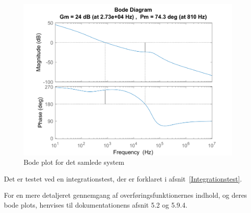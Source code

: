 \begin{figure}[H]
	\center
	\includegraphics[max width=0.7\linewidth]{../dokumentation/tex/2iteration/billeder/MATLAB_total.PNG}
	\caption{Bode plot for det samlede system}
	\label{fig:MATLAB_tot}
\end{figure}

\noindent Det er testet ved en integrationstest, der er forklaret i afsnit~\ref{Integrationstest}.

For en mere detaljeret gennemgang af overføringsfunktionernes indhold, og deres bode plots, henvises til dokumentationens afsnit 5.2 og 5.9.4.



